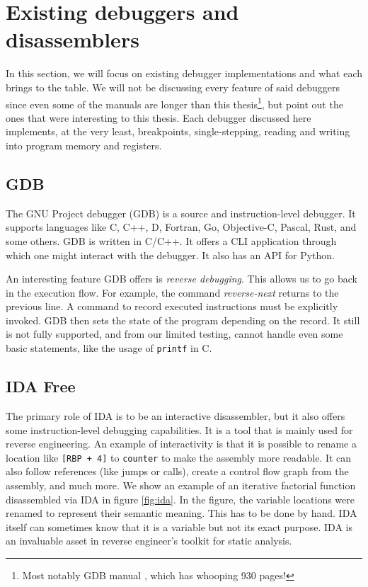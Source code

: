 \section{Existing debuggers and disassemblers}
In this section, we will focus on existing debugger implementations and what
each brings to the table. We will not be discussing every feature of said
debuggers since even some of the manuals are longer than this
thesis\footnote{Most notably GDB manual \cite{gdb-manual}, which has whooping
930 pages!}, but point out the ones that were interesting to this thesis. Each
debugger discussed here implements, at the very least, breakpoints,
single-stepping, reading and writing into program memory and registers.

\subsection{GDB}
The GNU Project debugger (GDB) \cite{gdb-manual} is a source and
instruction-level debugger. It supports languages like C, C++, D, Fortran, Go,
Objective-C, Pascal, Rust, and some others. GDB is written in C/C++. It offers
a CLI application through which one might interact with the debugger. It also
has an API for Python.

An interesting feature GDB offers is \textit{reverse debugging}. This allows us
to go back in the execution flow. For example, the command
\textit{reverse-next} returns to the previous line. A command to record
executed instructions must be explicitly invoked. GDB then sets the state of
the program depending on the record. It still is not fully supported, and from
our limited testing, cannot handle even some basic statements, like the usage
of \texttt{printf} in C.

\subsection{IDA Free}
The primary role of IDA is to be an interactive disassembler, but it also
offers some instruction-level debugging capabilities. It is a tool that is
mainly used for reverse engineering. An example of interactivity is that it is
possible to rename a location like \texttt{[RBP + 4]} to \texttt{counter} to
make the assembly more readable. It can also follow references (like jumps or
calls), create a control flow graph from the assembly, and much more. We show
an example of an iterative factorial function disassembled via IDA in figure
\ref{fig:ida}. In the figure, the variable locations were renamed to represent
their semantic meaning. This has to be done by hand. IDA itself can sometimes
know that it is a variable but not its exact purpose. IDA is an invaluable
asset in reverse engineer's toolkit for static analysis.

